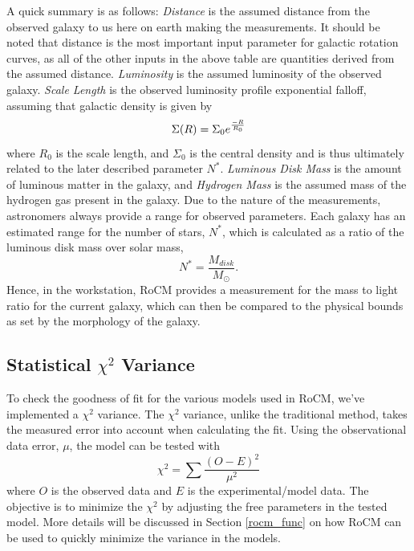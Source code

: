 \documentclass[conference]{IEEEtran-modified}
\begin{document}
A quick summary is as follows: \emph{Distance} is the assumed distance from the observed galaxy to us here on earth making the measurements.  It should be noted that distance is the most important input parameter for galactic rotation curves, as all of the other inputs in the above table are quantities derived from the assumed distance. \emph{Luminosity} is the assumed luminosity of the observed galaxy.  \emph{Scale Length} is the observed luminosity profile exponential falloff, assuming that galactic density is given by 
\begin{equation}
\Sigma(R)=\Sigma_0e^{\frac{-R}{R_0}}\\
\end{equation}
where {$R_0$} is the scale length, and {$\Sigma_0$} is the central density and is thus ultimately related to the later described parameter {$N^*$}.  \emph{Luminous Disk Mass} is the amount of luminous matter in the galaxy, and \emph{Hydrogen Mass} is the assumed mass of the hydrogen gas present in the galaxy.  Due to the nature of the measurements, astronomers always provide a range for observed parameters. Each galaxy has an estimated range for the number of stars, $N^*$, which is calculated as a ratio of the luminous disk mass over solar mass,
\begin{equation}
N^* = \frac{M_{disk}}{M_{\odot}}.
\end{equation}
Hence, in the workstation, RoCM provides a measurement for the mass to light ratio for the current galaxy, which can then be compared to the physical bounds as set by the morphology of the galaxy.


\subsection{Statistical $\chi^2$ Variance}
To check the goodness of fit for the various models used in RoCM, we've implemented a $\chi^2$ variance. The $\chi^2$ variance, unlike the traditional method, takes the measured error into account when calculating the fit. Using the observational data error, $\mu$, the model can be tested with
\begin{equation}
\chi^2 = \sum \frac{(O-E)^2}{\mu^2}
\end{equation} 
where $O$ is the observed data and $E$ is the experimental/model data. The objective is to minimize the $\chi^2$ by adjusting the free parameters in the tested model.  More details will be discussed in Section \ref{rocm_func} on how RoCM can be used to quickly minimize the variance in the models.
\end{document}
